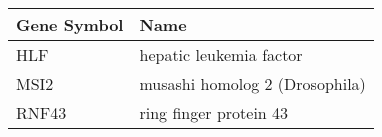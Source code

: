 \begin{tabular}{ll}
\toprule
Gene Symbol &                           Name \\
\midrule
        HLF &        hepatic leukemia factor \\
       MSI2 & musashi homolog 2 (Drosophila) \\
      RNF43 &         ring finger protein 43 \\
\bottomrule
\end{tabular}
